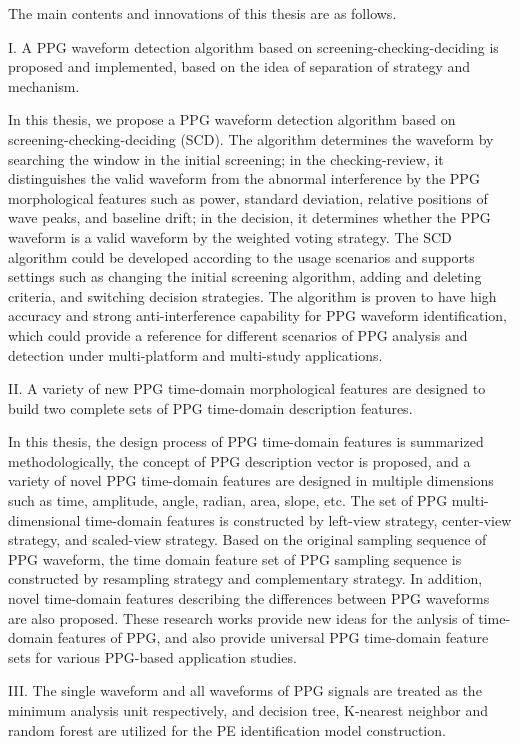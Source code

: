 The main contents and innovations of this thesis are as follows.

I. A PPG waveform detection algorithm based on screening-checking-deciding is proposed and implemented, based on the idea of separation of strategy and mechanism.

In this thesis, we propose a PPG waveform detection algorithm based on screening-checking-deciding (SCD). The algorithm determines the waveform by searching the window 
in the initial screening; in the checking-review, it distinguishes the valid waveform from the abnormal interference by the PPG morphological features such as power, standard deviation, 
relative positions of wave peaks, and baseline drift; in the decision, it determines whether the PPG waveform is a valid waveform by the weighted voting strategy. 
The SCD algorithm could be developed according to the usage scenarios and supports settings such as changing the initial screening algorithm, adding and deleting criteria, 
and switching decision strategies. The algorithm is proven to have high accuracy and strong anti-interference capability for PPG waveform identification, 
which could provide a reference for different scenarios of PPG analysis and detection under multi-platform and multi-study applications.

II. A variety of new PPG time-domain morphological features are designed to build two complete sets of PPG time-domain description features.

In this thesis, the design process of PPG time-domain features is summarized methodologically, the concept of PPG description vector is proposed, 
and a variety of novel PPG time-domain features are designed in multiple dimensions such as time, amplitude, angle, radian, area, slope, etc. 
The set of PPG multi-dimensional time-domain features is constructed by left-view strategy, center-view strategy, and scaled-view strategy. 
Based on the original sampling sequence of PPG waveform, the time domain feature set of PPG sampling sequence is constructed by resampling strategy and 
complementary strategy. In addition, novel time-domain features describing the differences between PPG waveforms are also proposed. 
These research works provide new ideas for the anlysis of time-domain features of PPG, and also provide universal PPG time-domain feature sets for various PPG-based application studies.

III. The single waveform and all waveforms of PPG signals are treated as the minimum analysis unit respectively, 
and decision tree, K-nearest neighbor and random forest are utilized for the PE identification model construction.

